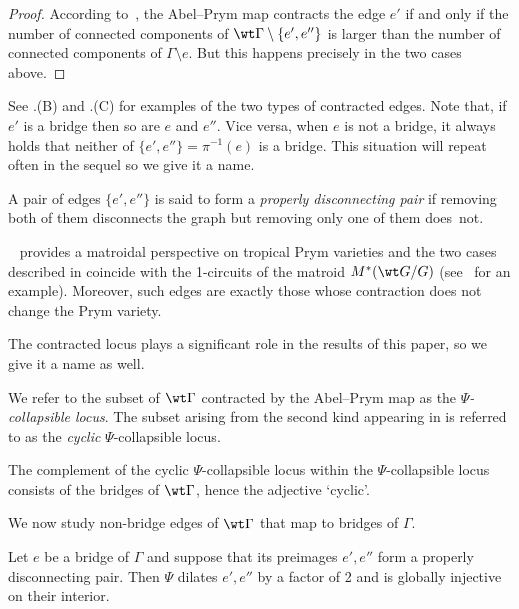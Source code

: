\begin{proof}
According to~\cite[Theorem 4.1]{LZ22}, the Abel--Prym map contracts the edge $e'$ if and only if  the number     of connected components of $\wt\Gamma\setminus\{e',e''\}$ is larger than the number of connected components of $\Gamma\setminus{e}$. But this happens precisely in the two cases above.
\end{proof}

See .(B) and .(C) for examples of the two types of contracted edges. 
Note that, if $e'$ is a bridge then so are $e$ and $e''$. Vice versa, when $e$ is not a bridge, it  always holds that neither  of $\{e',e''\}=\pi^{-1}(e)$ is a bridge. This situation will repeat often in the sequel so we give it a name.   

\begin{defi}\label{def:propdiscpair}
    A pair of edges $\{e',e''\}$ is said to form a  \emph{properly disconnecting pair} if removing both of them disconnects the graph but removing only one of them does~not. 
\end{defi}


\begin{rema}
~\cite{RZ_matroidal} provides  a matroidal perspective on  tropical Prym varieties and the two cases described in  coincide with the 1-circuits of the matroid ${M}^*(\wt G/G)$ (see~\cite[Figure 3]{RZ_matroidal} for an example). Moreover, such edges are exactly those whose contraction does not change the Prym variety.
\end{rema}


The contracted locus plays a significant role in the results of this paper, so we give it a name as well. 
\begin{defi}
    We refer to the subset of $\wt\Gamma$ contracted by the Abel--Prym map  as the \emph{$\Psi$-collapsible locus}.  The subset arising from the second kind appearing in 
     is referred to as the \emph{cyclic} $\Psi$-collapsible locus. 
\end{defi}

The complement of the   cyclic $\Psi$-collapsible locus   within the $\Psi$-collapsible locus consists of the bridges of $\wt\Gamma$, hence the adjective `cyclic'. 

We now study non-bridge edges of $\wt\Gamma$ that map to bridges of $\Gamma$. 


\begin{lemma}\label{lem:edgeMappedWithMultiplicity2}
    Let $e$ be a bridge  of $\Gamma$ and suppose that its preimages  $e',e''$ form a properly disconnecting pair.  
    Then $\Psi$ dilates $e',e''$ by a factor of 2 and is globally injective on their interior.
    \end{lemma}


